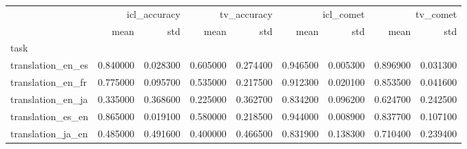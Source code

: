 \begin{tabular}{lrrrrrrrr}
\toprule
 & \multicolumn{2}{r}{icl_accuracy} & \multicolumn{2}{r}{tv_accuracy} & \multicolumn{2}{r}{icl_comet} & \multicolumn{2}{r}{tv_comet} \\
 & mean & std & mean & std & mean & std & mean & std \\
task &  &  &  &  &  &  &  &  \\
\midrule
translation_en_es & 0.840000 & 0.028300 & 0.605000 & 0.274400 & 0.946500 & 0.005300 & 0.896900 & 0.031300 \\
translation_en_fr & 0.775000 & 0.095700 & 0.535000 & 0.217500 & 0.912300 & 0.020100 & 0.853500 & 0.041600 \\
translation_en_ja & 0.335000 & 0.368600 & 0.225000 & 0.362700 & 0.834200 & 0.096200 & 0.624700 & 0.242500 \\
translation_es_en & 0.865000 & 0.019100 & 0.580000 & 0.218500 & 0.944000 & 0.008900 & 0.837700 & 0.107100 \\
translation_ja_en & 0.485000 & 0.491600 & 0.400000 & 0.466500 & 0.831900 & 0.138300 & 0.710400 & 0.239400 \\
\bottomrule
\end{tabular}

